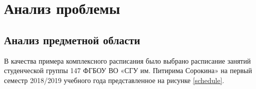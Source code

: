 \section{Анализ проблемы}

\subsection{Анализ предметной области}

В качества примера комплексного расписания было выбрано расписание занятий студенческой группы 147 ФГБОУ ВО «СГУ им. Питирима Сорокина» на первый семестр 2018/2019 учебного года  представленное на рисунке \ref{schedule}.


\clearpage